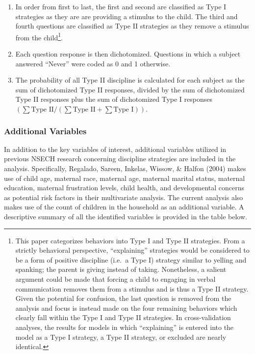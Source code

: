 \documentclass[review]{elsarticle}\usepackage[]{graphicx}\usepackage[]{color}
\begin{document}
\begin{enumerate}
\def\labelenumi{\arabic{enumi}.}
\itemsep1pt\parskip0pt
\item
  In order from first to last, the first and second are classified as
  Type I strategies as they are are providing a stimulus to the child.
  The third and fourth questions are classified as Type II strategies as
  they remove a stimulus from the child\footnote{This paper categorizes
    behaviors into Type I and Type II strategies. From a strictly
    behavioral perspective, ``explaining'' strategies would be
    considered to be a form of positive discipline (i.e.~a Type I)
    strategy similar to yelling and spanking; the parent is giving
    instead of taking. Nonetheless, a salient argument could be made
    that forcing a child to engaging in verbal communication removes
    them from a stimulus and is thus a Type II strategy. Given the
    potential for confusion, the last question is removed from the
    analysis and focus is instead made on the four remaining behaviors
    which clearly fall within the Type I and Type II strategies. In
    cross-validation analyses, the results for models in which
    ``explaining'' is entered into the model as a Type I strategy, a
    Type II strategy, or excluded are nearly identical.}.
\item
  Each question response is then dichotomized. Questions in which a
  subject answered ``Never'' were coded as 0 and 1 otherwise.
\item
  The probability of all Type II discipline is calculated for each
  subject as the sum of dichotomized Type II responses, divided by the
  sum of dichotomized Type II responses plus the sum of dichotomized
  Type I responses
  $(\sum\text{Type II}/(\sum\text{Type II} + \sum\text{Type I}))$.
\end{enumerate}

\subsubsection{Additional Variables}\label{additional-variables}

In addition to the key variables of interest, additional variables
utilized in previous NSECH research concerning discipline strategies are
included in the analysis. Specifically, Regalado, Sareen, Inkelas,
Wissow, \& Halfon (2004) makes use of child age, maternal race, maternal
age, maternal marital status, maternal education, maternal frustration
levels, child health, and developmental concerns as potential risk
factors in their multivariate analysis. The current analysis also makes
use of the count of children in the household as an additional variable.
A descriptive summary of all the identified variables is provided in the
table below.
\end{document}
